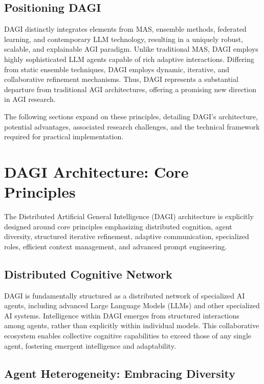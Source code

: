 \documentclass[12pt]{amsart}
\begin{document}
\subsection{Positioning DAGI}
DAGI distinctly integrates elements from MAS, ensemble methods, federated learning, and contemporary LLM technology, resulting in a uniquely robust, scalable, and explainable AGI paradigm. Unlike traditional MAS, DAGI employs highly sophisticated LLM agents capable of rich adaptive interactions. Differing from static ensemble techniques, DAGI employs dynamic, iterative, and collaborative refinement mechanisms. Thus, DAGI represents a substantial departure from traditional AGI architectures, offering a promising new direction in AGI research.

The following sections expand on these principles, detailing DAGI’s architecture, potential advantages, associated research challenges, and the technical framework required for practical implementation.



\section{DAGI Architecture: Core Principles}

The Distributed Artificial General Intelligence (DAGI) architecture is explicitly designed around core principles emphasizing distributed cognition, agent diversity, structured iterative refinement, adaptive communication, specialized roles, efficient context management, and advanced prompt engineering.

\subsection{Distributed Cognitive Network}

DAGI is fundamentally structured as a distributed network of specialized AI agents, including advanced Large Language Models (LLMs) and other specialized AI systems. Intelligence within DAGI emerges from structured interactions among agents, rather than explicitly within individual models. This collaborative ecosystem enables collective cognitive capabilities to exceed those of any single agent, fostering emergent intelligence and adaptability.

\subsection{Agent Heterogeneity: Embracing Diversity}
\end{document}
